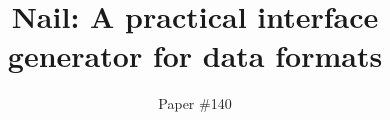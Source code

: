 \documentclass[10pt,twocolumn]{article}
\begin{document}
\author{Paper \#140}
\date{}
\title{Nail: A practical interface generator for data formats}

\maketitle









% 



\end{document}
